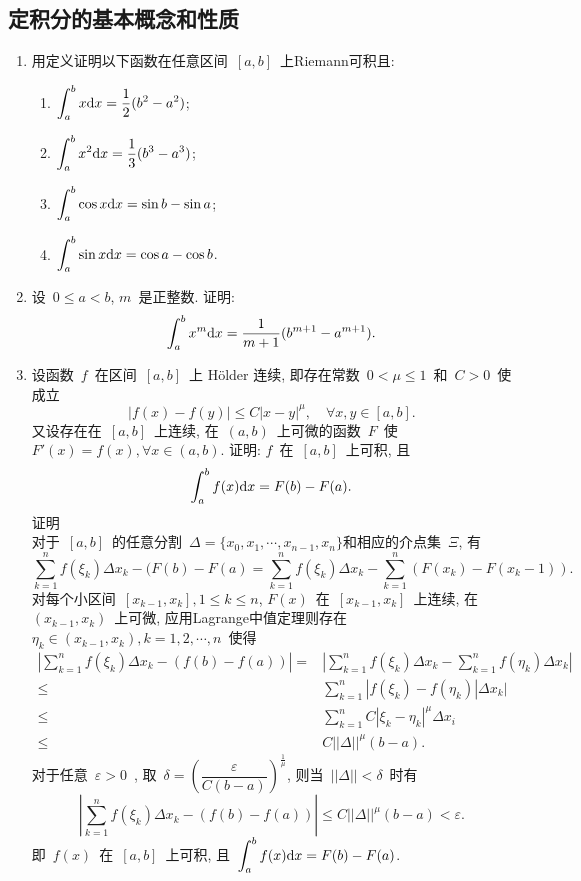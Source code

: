 \documentclass[UTF8,a4paper,20pt]{article}
\begin{document}
\subsection{定积分的基本概念和性质}
\begin{enumerate}
\item 用定义证明以下函数在任意区间~$[a,b]$~上Riemann可积且:
	\begin{enumerate}[(1)]
	\item $\displaystyle\int_a^b x\mathrm{d}x=\dfrac{1}{2}(b^2-a^2)$;
	\item $\displaystyle\int_a^b x^2\mathrm{d}x=\dfrac{1}{3}(b^3-a^3)$;
	\item $\displaystyle\int_a^b \cos{x}\mathrm{d}x=\sin{b}-\sin{a}$;
	\item $\displaystyle\int_a^b \sin{x}\mathrm{d}x=\cos{a}-\cos{b}$.
	\end{enumerate}

\item 设~$0\leqslant a<b$, $m$~是正整数. 证明:
\[ \int_a^b x^m\mathrm{d}x=\frac{1}{m+1}(b^{m+1}-a^{m+1}).\]

\item 设函数~$f$~在区间~$[a,b]$~上 H\"older 连续, 即存在常数~$0<\mu\leqslant 1$~和~$C>0$~使成立
\[ |f(x)-f(y)|\leqslant C|x-y|^{\mu}, \quad\forall x,y\in[a,b]. \]
又设存在在~$[a,b]$~上连续, 在~$(a,b)$~上可微的函数~$F$~使~$F'(x)=f(x), \forall x\in(a,b)$. 证明: $f$~在~$[a,b]$~上可积, 且
\[ \int_a^b f(x)\mathrm{d}x=F(b)-F(a). \]
{\heiti 证明}\\
对于~$[a,b]$~的任意分割~$\Delta=\{x_0, x_1, \cdots, x_{n-1}, x_n\}$和相应的介点集~$\Xi$, 有
\[ \sum_{k=1}^nf(\xi_k)\Delta x_k-(F(b)-F(a)=\sum_{k=1}^nf(\xi_k)\Delta x_k-\sum_{k=1}^n(F(x_k)-F(x_k-1)).\]
对每个小区间~$[x_{k-1}, x_k], 1\leqslant k\leqslant n$, $F(x)$~在~$[x_{k-1}, x_k]$~上连续, 在~$(x_{k-1}, x_k)$~上可微, 应用Lagrange中值定理则存在~$\eta_k\in(x_{k-1}, x_k), k=1,2,\cdots,n$~使得
\begin{equation*}
	\begin{split}
		|\sum_{k=1}^nf(\xi_k)\Delta x_k-(f(b)-f(a))|=&|\sum_{k=1}^n f(\xi_k)\Delta x_k-\sum_{k=1}^n f(\eta_k)\Delta x_k|\\
		\leqslant&\sum_{k=1}^n|f(\xi_k)-f(\eta_k)|\Delta x_k|\\
		\leqslant&\sum_{k=1}^n C|\xi_k-\eta_k|^{\mu}\Delta x_i \\
		\leqslant&C||\Delta||^{\mu}(b-a).
	\end{split}
\end{equation*}
对于任意~$\varepsilon>0$~, 取~$\delta=\left(\dfrac{\varepsilon}{C(b-a)}\right)^{\frac{1}{\mu}}$, 则当~$||\Delta||<\delta$~时有
\[|\sum_{k=1}^nf(\xi_k)\Delta x_k-(f(b)-f(a))|\leqslant C||\Delta||^{\mu}(b-a)<\varepsilon.\]
即~$f(x)$~在~$[a,b]$~上可积, 且~$\displaystyle \int_a^b f(x)\mathrm{d}x=F(b)-F(a)$.
		

\end{enumerate}
\end{document}
